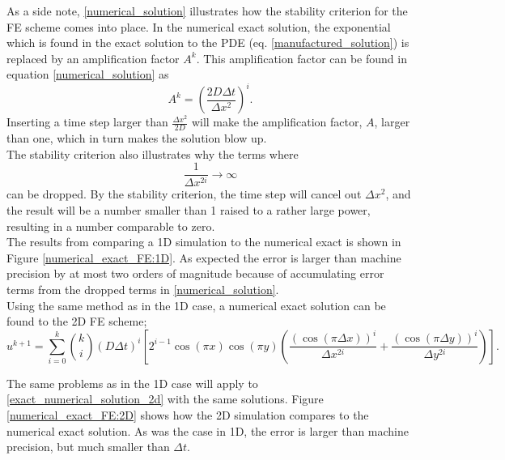 As a side note, \eqref{numerical_solution} illustrates how the stability criterion for the FE scheme comes into place. 
In the numerical exact solution, the exponential which is found in the exact solution to the PDE (eq. \ref{manufactured_solution}) is replaced by an amplification factor $A^k$.
This amplification factor can be found in equation \eqref{numerical_solution} as 
\begin{equation}
A^k = \left(\frac{2D\Delta t}{\Delta x^2}\right)^i.
\end{equation}
Inserting a time step larger than $\frac{\Delta x^2}{2D}$ will make the amplification factor, $A$, larger than one, which in turn makes the solution blow up. \\

\noindent The stability criterion also illustrates why the terms where 
$$ \frac{1}{\Delta x^{2i}} \to \infty$$
 can be dropped. 
 By the stability criterion, the time step will cancel out $\Delta x^2$, and the result will be a number smaller than 1 raised to a rather large power, resulting in a number comparable to zero.\\
 
 The results from comparing a 1D simulation to the numerical exact is shown in Figure \ref{numerical_exact_FE:1D}. 
 As expected the error is larger than machine precision by at most two orders of magnitude because of accumulating error terms from the dropped terms in \eqref{numerical_solution}.\\
 
\noindent Using the same method as in the 1D case, a numerical exact solution can be found to the 2D FE scheme; 
 \begin{equation}\label{exact_numerical_solution_2d}
 u^{k+1} = \sum\limits^k_{i=0}{k\choose i}\left(D\Delta t\right)^i\left[2^{i-1}\cos(\pi x)\cos(\pi y)\left(\frac{(\cos(\pi\Delta x))^i}{\Delta x^{2i}} +\frac{(\cos(\pi\Delta y))^i}{\Delta y^{2i}}\right)\right].
\end{equation}

The same problems as in the 1D case will apply to \eqref{exact_numerical_solution_2d} with the same solutions. 
Figure \ref{numerical_exact_FE:2D} shows how the 2D simulation compares to the numerical exact solution. 
As was the case in 1D, the error is larger than machine precision, but much smaller than $\Delta t$.

